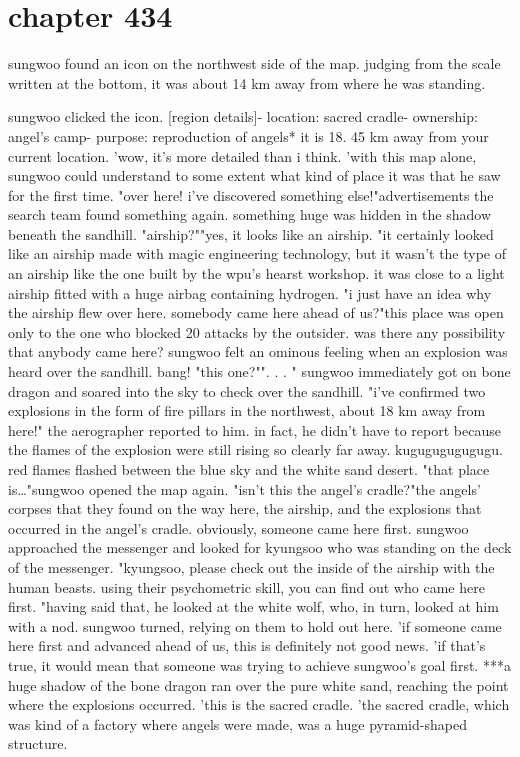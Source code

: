 \section{chapter 434}

sungwoo found an icon on the northwest side of the map.
 judging from the scale written at the bottom, it was about 14 km away from where he was standing.





sungwoo clicked the icon.
[region details]- location: sacred cradle- ownership: angel's camp- purpose: reproduction of angels* it is 18.
45 km away from your current location.
'wow, it's more detailed than i think.
'with this map alone, sungwoo could understand to some extent what kind of place it was that he saw for the first time.
"over here! i've discovered something else!"advertisements    the search team found something again.
 something huge was hidden in the shadow beneath the sandhill.
 "airship?""yes, it looks like an airship.
"it certainly looked like an airship made with magic engineering technology, but it wasn't the type of an airship like the one built by the wpu's hearst workshop.
it was close to a light airship fitted with a huge airbag containing hydrogen.
"i just have an idea why the airship flew over here.
 somebody came here ahead of us?"this place was open only to the one who blocked 20 attacks by the outsider.
 was there any possibility that anybody came here? sungwoo felt an ominous feeling when an explosion was heard over the sandhill.
bang! "this one?"".
.
.
"
sungwoo immediately got on bone dragon and soared into the sky to check over the sandhill.
 "i've confirmed two explosions in the form of fire pillars in the northwest, about 18 km away from here!" the aerographer reported to him.
in fact, he didn't have to report because the flames of the explosion were still rising so clearly far away.
kugugugugugugu.
red flames flashed between the blue sky and the white sand desert.
 "that place is…"sungwoo opened the map again.
"isn't this the angel's cradle?"the angels' corpses that they found on the way here, the airship, and the explosions that occurred in the angel's cradle.
obviously, someone came here first.
sungwoo approached the messenger and looked for kyungsoo who was standing on the deck of the messenger.
 "kyungsoo, please check out the inside of the airship with the human beasts.
 using their psychometric skill, you can find out who came here first.
"having said that, he looked at the white wolf, who, in turn, looked at him with a nod.
sungwoo turned, relying on them to hold out here.
 'if someone came here first and advanced ahead of us, this is definitely not good news.
'if that's true, it would mean that someone was trying to achieve sungwoo's goal first.
***a huge shadow of the bone dragon ran over the pure white sand, reaching the point where the explosions occurred.
'this is the sacred cradle.
'the sacred cradle, which was kind of a factory where angels were made, was a huge pyramid-shaped structure.

